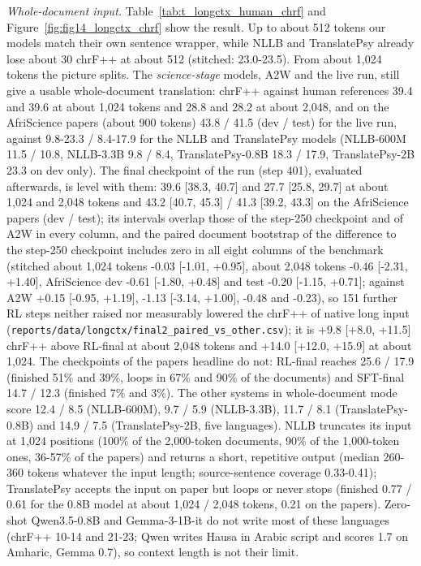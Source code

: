 \emph{Whole-document input.} Table~\ref{tab:t_longctx_human_chrf} and Figure~\ref{fig:fig14_longctx_chrf} show the result. Up to about 512 tokens our models match their own sentence wrapper, while NLLB and TranslatePsy already lose about 30 chrF++ at about 512 (stitched: 23.0-23.5). From about 1,024 tokens the picture splits. The \emph{science-stage} models, A2W and the live run, still give a usable whole-document translation: chrF++ against human references 39.4 and 39.6 at about 1,024 tokens and 28.8 and 28.2 at about 2,048, and on the AfriScience papers (about 900 tokens) 43.8 / 41.5 (dev / test) for the live run, against 9.8-23.3 / 8.4-17.9 for the NLLB and TranslatePsy models (NLLB-600M 11.5 / 10.8, NLLB-3.3B 9.8 / 8.4, TranslatePsy-0.8B 18.3 / 17.9, TranslatePsy-2B 23.3 on dev only). The final checkpoint of the run (step 401), evaluated afterwards, is level with them: 39.6 {[}38.3, 40.7{]} and 27.7 {[}25.8, 29.7{]} at about 1,024 and 2,048 tokens and 43.2 {[}40.7, 45.3{]} / 41.3 {[}39.2, 43.3{]} on the AfriScience papers (dev / test); its intervals overlap those of the step-250 checkpoint and of A2W in every column, and the paired document bootstrap of the difference to the step-250 checkpoint includes zero in all eight columns of the benchmark (stitched about 1,024 tokens -0.03 {[}-1.01, +0.95{]}, about 2,048 tokens -0.46 {[}-2.31, +1.40{]}, AfriScience dev -0.61 {[}-1.80, +0.48{]} and test -0.20 {[}-1.15, +0.71{]}; against A2W +0.15 {[}-0.95, +1.19{]}, -1.13 {[}-3.14, +1.00{]}, -0.48 and -0.23), so 151 further RL steps neither raised nor measurably lowered the chrF++ of native long input (\texttt{reports/data/longctx/final2\_paired\_vs\_other.csv}); it is +9.8 {[}+8.0, +11.5{]} chrF++ above RL-final at about 2,048 tokens and +14.0 {[}+12.0, +15.9{]} at about 1,024. The checkpoints of the paper\textquotesingle s headline do not: RL-final reaches 25.6 / 17.9 (finished 51\% and 39\%, loops in 67\% and 90\% of the documents) and SFT-final 14.7 / 12.3 (finished 7\% and 3\%). The other systems in whole-document mode score 12.4 / 8.5 (NLLB-600M), 9.7 / 5.9 (NLLB-3.3B), 11.7 / 8.1 (TranslatePsy-0.8B) and 14.9 / 7.5 (TranslatePsy-2B, five languages). NLLB truncates its input at 1,024 positions (100\% of the 2,000-token documents, 90\% of the 1,000-token ones, 36-57\% of the papers) and returns a short, repetitive output (median 260-360 tokens whatever the input length; source-sentence coverage 0.33-0.41); TranslatePsy accepts the input on paper but loops or never stops (finished 0.77 / 0.61 for the 0.8B model at about 1,024 / 2,048 tokens, 0.21 on the papers). Zero-shot Qwen3.5-0.8B and Gemma-3-1B-it do not write most of these languages (chrF++ 10-14 and 21-23; Qwen writes Hausa in Arabic script and scores 1.7 on Amharic, Gemma 0.7), so context length is not their limit.

